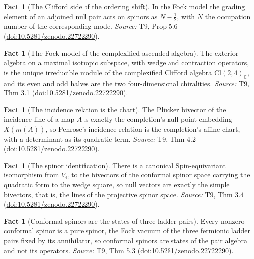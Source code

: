 \documentclass[11pt]{article}
\theoremstyle{definition}
\newtheorem{fact}[theorem]{Fact}
\theoremstyle{plain}
\providecommand{\C}{}\renewcommand{\C}{\mathbb{C}}
\providecommand{\Cl}{}\renewcommand{\Cl}{\mathrm{Cl}}
\providecommand{\Spin}{}\renewcommand{\Spin}{\mathrm{Spin}}
\begin{document}
\begin{fact}[The Clifford side of the ordering shift]\label{c:correspondence.clifford-side-ordering-shift}
In the Fock model the grading element of an adjoined null pair acts on spinors as $N - \tfrac12$, with $N$ the occupation number of the corresponding mode.
\emph{Source:} T9, Prop 5.6 (\href{https://doi.org/10.5281/zenodo.22722290}{doi:10.5281/zenodo.22722290}).
\end{fact}

\begin{fact}[The Fock model of the complexified ascended algebra]\label{c:correspondence.fock-model-complexified-ascended-algebra}
The exterior algebra on a maximal isotropic subspace, with wedge and contraction operators, is the unique irreducible module of the complexified Clifford algebra $\Cl(2,4)_\C$, and its even and odd halves are the two four-dimensional chiralities.
\emph{Source:} T9, Thm 3.1 (\href{https://doi.org/10.5281/zenodo.22722290}{doi:10.5281/zenodo.22722290}).
\end{fact}

\begin{fact}[The incidence relation is the chart]\label{c:correspondence.incidence-relation-chart}
The Pl\"ucker bivector of the incidence line of a map $A$ is exactly the completion's null point embedding $X(m(A))$, so Penrose's incidence relation is the completion's affine chart, with a determinant as its quadratic term.
\emph{Source:} T9, Thm 4.2 (\href{https://doi.org/10.5281/zenodo.22722290}{doi:10.5281/zenodo.22722290}).
\end{fact}

\begin{fact}[The spinor identification]\label{c:correspondence.spinor-identification}
There is a canonical $\Spin$-equivariant isomorphism from $V_\C$ to the bivectors of the conformal spinor space carrying the quadratic form to the wedge square, so null vectors are exactly the simple bivectors, that is, the lines of the projective spinor space.
\emph{Source:} T9, Thm 3.4 (\href{https://doi.org/10.5281/zenodo.22722290}{doi:10.5281/zenodo.22722290}).
\end{fact}

\begin{fact}[Conformal spinors are the states of three ladder pairs]\label{c:correspondence.twistors-are-states-three-ladder-pairs}
Every nonzero conformal spinor is a pure spinor, the Fock vacuum of the three fermionic ladder pairs fixed by its annihilator, so conformal spinors are states of the pair algebra and not its operators.
\emph{Source:} T9, Thm 5.3 (\href{https://doi.org/10.5281/zenodo.22722290}{doi:10.5281/zenodo.22722290}).
\end{fact}
\end{document}
